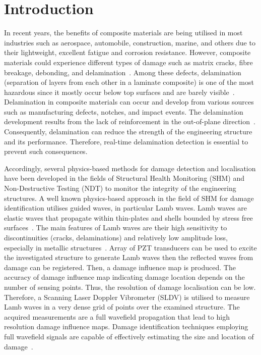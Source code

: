 \section{Introduction}
In recent years, the benefits of composite materials are being utilised in most industries such as aerospace, automobile, construction, marine, and others due to their lightweight, excellent fatigue and corrosion resistance.
However, composite materials could experience different types of damage such as matrix cracks, fibre breakage, debonding, and delamination~\cite{ip2004delamination, smith2009composite}. 
Among these defects, delamination (separation of layers from each other in a laminate composite) is one of the most hazardous since it mostly occur below top surfaces and are barely visible~\cite{Cai2012}.
Delamination in composite materials can occur and develop from various sources such as  manufacturing defects, notches, and impact events.
The delamination development results from the lack of reinforcement in the out-of-plane direction~\cite{Cai2012}.
Consequently, delamination can reduce the strength of the engineering structure and its performance. 
Therefore, real-time delamination detection is essential to prevent such consequences. 
 
Accordingly, several physics-based methods for damage detection and localisation have been developed in the fields of Structural Health Monitoring (SHM) and Non-Destructive Testing (NDT) to monitor the integrity of the engineering structures.
A well known physics-based approach in the field of SHM for damage identification utilises guided waves, in particular Lamb waves.
Lamb waves are elastic waves that propagate within thin-plates and shells bounded by stress free surfaces~\cite{mitra2016guided}.
The main features of Lamb waves are their high sensitivity to discontinuities (cracks, delaminations) and relatively low amplitude loss, especially in metallic structures~\cite{Keulen2014}.
Array of PZT transducers can be used to excite the investigated structure to generate Lamb waves then the reflected waves from damage can be registered. 
Then, a damage influence map is produced.
The accuracy of damage influence map indicating damage location depends on the number of sensing points. 
Thus, the resolution of damage localisation can be low.
Therefore, a Scanning Laser Doppler Vibrometer (SLDV) is utilised to measure Lamb waves in a very dense grid of points over the examined structure.
The acquired measurements are a full wavefield propagation that lead to high resolution damage influence maps.
Damage identification techniques employing full wavefield signals are capable of effectively estimating the size and location of damage~\cite{Girolamo2018a, kudela2018impact}. 

